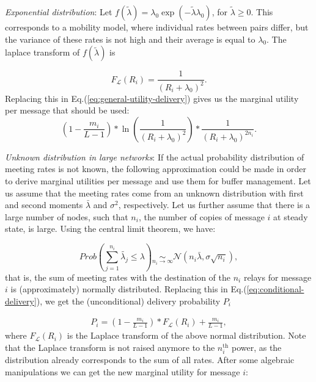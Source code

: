 \emph{Exponential distribution}: Let $f(\tilde{\lambda}) = \lambda_{0} \exp(-\tilde{\lambda} \lambda_{0})$, for $\tilde{\lambda} \ge 0$. This corresponds to a mobility model, where individual rates between pairs differ, but the variance of these rates is not high and their average is equal to $\lambda_0$. The laplace transform of $f(\tilde{\lambda})$ is

\begin{equation*}
F_{\mathcal{L}}(R_{i}) = \frac{1}{(R_{i} + \lambda_{0})^{2}}.
\end{equation*}
Replacing this in Eq.(\ref{eq:general-utility-delivery}) gives us the marginal utility per message that should be used:
\begin{equation}
(1 - \frac{m_i}{L-1}) * \ln(\frac{1}{(R_{i} + \lambda_{0})^{2}}) * \frac{1}{(R_{i} + \lambda_{0})^{2n_{i}}}.
\end{equation}

\emph{Unknown distribution in large networks}: If the actual probability distribution of meeting rates is not known, the following approximation could be made in order to derive marginal utilities per message and use them for buffer management. Let us assume that the meeting rates come from an unknown distribution with first and second moments $\bar{\lambda}$ and $\sigma^{2}$, respectively. Let us further assume that there is a large number of nodes, such that $n_{i}$, the number of copies of message $i$ at steady state, is large. Using the central limit theorem, we have:

\begin{equation}
Prob(\sum_{j=1}^{n_{i}} \tilde{\lambda_{j}} \le \lambda) \underset{n_{i} \rightarrow \infty}{\sim} \mathcal{N}(n_{i}\bar{\lambda}, \sigma \sqrt{n_{i}}),
\end{equation}
that is, the sum of meeting rates with the destination of the $n_{i}$ relays for message $i$ is (approximately) normally distributed. Replacing this in Eq.(\ref{eq:conditional-delivery}), we get the (unconditional) delivery probability $P_{i}$

\begin{eqnarray*}
P_{i} = (1 - \frac{m_i}{L-1})* F_{\mathcal{L}}(R_{i}) + \frac{m_i}{L-1},
\end{eqnarray*}
where $F_{\mathcal{L}}(R_{i})$ is the Laplace transform of the above normal distribution. Note that the Laplace transform is not raised anymore to the $n_{i}^{\mbox{th}}$ power, as the distribution already corresponds to the sum of all rates. After some algebraic manipulations we can get the new marginal utility for message $i$:

